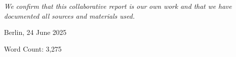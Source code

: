 \chapter*{}
\vspace{17cm}
\hfill\parbox{8cm}{
\raggedleft
	\textit{We confirm that this collaborative report is our own work and that we have documented all sources and materials used.}\par 
	\vspace{1em}
	Berlin, 24 June 2025

	\vspace{3em}
	{\footnotesize Word Count: 3,275}
}
\thispagestyle{empty}